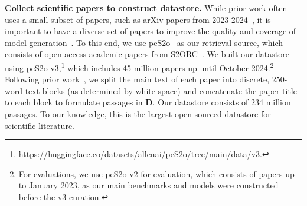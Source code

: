 \documentclass{article} %
\renewcommand{\paragraph}[1]{\noindent \textbf{#1}}
\begin{document}
\paragraph{Collect scientific papers to construct datastore.} 
 While prior work often uses a small subset of papers, such as arXiv papers from 2023-2024~\citep{zheng2024openresearcher}, it is important to have a diverse set of papers to improve the quality and coverage of model generation~\citep{shao2024scaling}. 
To this end, we use peS2o~\citep{soldaini2024dolma} as our retrieval source, which consists of open-access academic papers from S2ORC~\citep{lo-etal-2020-s2orc}. We  built our datastore using peS2o v3,\footnote{\url{https://huggingface.co/datasets/allenai/peS2o/tree/main/data/v3}.} which includes 45 million papers up until October 2024.\footnote{
For evaluations, we use peS2o v2 for evaluation, which consists of papers up to January 2023, as our main benchmarks and models were constructed before the v3 curation. }
 Following prior work~\citep{shao2024scaling}, we split the main text of each paper into discrete, 250-word text blocks (as determined by white space) and concatenate the paper title to each block to formulate passages in $\mathbf{D}$.
Our datastore consists of 234 million passages. 
To our knowledge, this is the largest open-sourced datastore for scientific literature. 
\end{document}
